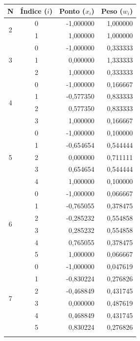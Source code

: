 \begin{table}[htpb]
\centering
\begin{tabular}{|c|c|r|r|}
\hline
\rowcolor[HTML]{C0C0C0} 
{\color[HTML]{333333} \textbf{N}} & 
{\color[HTML]{333333} \textbf{Índice ($i$)}} & 
{\color[HTML]{333333} \textbf{Ponto ($x_i$)}} & 
{\color[HTML]{333333} \textbf{Peso ($w_i$)}} \\ \hline
\multirow{2}{*}{2} 
& 0 & -1,000000 & 1,000000 \\ \cline{2-4}
& 1 & 1,000000 & 1,000000 \\ \hline
\multirow{3}{*}{3} 
& 0 & -1,000000 & 0,333333 \\ \cline{2-4}
& 1 & 0,000000 & 1,333333 \\ \cline{2-4}
& 2 & 1,000000 & 0,333333 \\ \hline
\multirow{4}{*}{4} 
& 0 & -1,000000 & 0,166667 \\ \cline{2-4}
& 1 & -0,577350 & 0,833333 \\ \cline{2-4}
& 2 & 0,577350 & 0,833333 \\ \cline{2-4}
& 3 & 1,000000 & 0,166667 \\ \hline
\multirow{5}{*}{5} 
& 0 & -1,000000 & 0,100000 \\ \cline{2-4}
& 1 & -0,654654 & 0,544444 \\ \cline{2-4}
& 2 &  0,000000 & 0,711111 \\ \cline{2-4}
& 3 &  0,654654 & 0,544444 \\ \cline{2-4}
& 4 &  1,000000 & 0,100000 \\ \hline
\multirow{6}{*}{6} 
& 0 & -1,000000 & 0,066667 \\ \cline{2-4}
& 1 & -0,765055 & 0,378475 \\ \cline{2-4}
& 2 & -0,285232 & 0,554858 \\ \cline{2-4}
& 3 &  0,285232 & 0,554858 \\ \cline{2-4}
& 4 &  0,765055 & 0,378475 \\ \cline{2-4}
& 5 &  1,000000 & 0,066667 \\ \hline
\multirow{7}{*}{7} 
& 0 & -1,000000 & 0,047619 \\ \cline{2-4}
& 1 & -0,830224 & 0,276826 \\ \cline{2-4}
& 2 & -0,468849 & 0,431745 \\ \cline{2-4}
& 3 &  0,000000 & 0,487619 \\ \cline{2-4}
& 4 &  0,468849 & 0,431745 \\ \cline{2-4}
& 5 &  0,830224 & 0,276826 \\ \cline{2-4}

\end{tabular}
\end{table}
